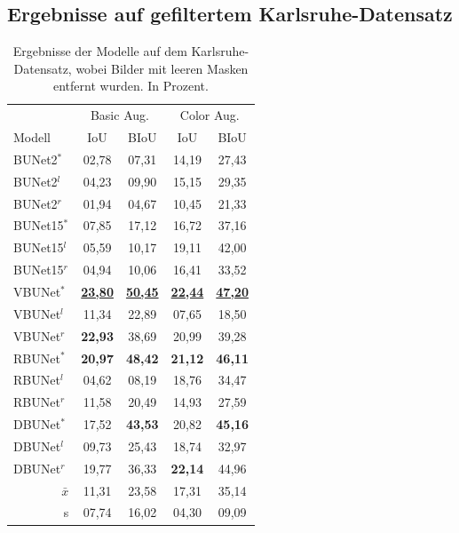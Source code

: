 \subsection{Ergebnisse auf gefiltertem Karlsruhe-Datensatz}

\begin{table}[ht]
	\centering
	\begin{tabular}{l|cc|cc}
		& \multicolumn{2}{c|}{Basic Aug.} & \multicolumn{2}{c}{Color Aug.} \\ 
		Modell & \ac{IoU} & \ac{BIoU}  & \ac{IoU} & \ac{BIoU}  \\
		\toprule
        BUNet2$^*$ & 02,78 & 07,31  &  14,19 & 27,43 \\
        BUNet2$^l$ & 04,23 & 09,90  &  15,15 & 29,35 \\
        BUNet2$^r$ & 01,94 & 04,67  &  10,45 & 21,33 \\
		\midrule

        BUNet15$^*$ & 07,85 & 17,12  &  16,72 & 37,16 \\
        BUNet15$^l$ & 05,59 & 10,17  &  19,11 & 42,00 \\
        BUNet15$^r$ & 04,94 & 10,06  &  16,41 & 33,52 \\
		\midrule

        VBUNet$^*$ & \underline{\textbf{23,80}} & \underline{\textbf{50,45}} &  \underline{\textbf{22,44}} & \underline{\textbf{47,20}} \\
        VBUNet$^l$ & 11,34 & 22,89 &  07,65 & 18,50 \\
        VBUNet$^r$ & \textbf{22,93} & 38,69 &  20,99 & 39,28 \\
		\midrule

        RBUNet$^*$ & \textbf{20,97} & \textbf{48,42} &  \textbf{21,12} & \textbf{46,11} \\
        RBUNet$^l$ & 04,62 & 08,19 &  18,76 & 34,47 \\
        RBUNet$^r$ & 11,58 & 20,49 &  14,93 & 27,59 \\
		\midrule

        DBUNet$^*$ & 17,52 & \textbf{43,53} &  20,82 & \textbf{45,16} \\
        DBUNet$^l$ & 09,73 & 25,43 &  18,74 & 32,97 \\
        DBUNet$^r$ & 19,77 & 36,33 &  \textbf{22,14} & 44,96 \\

		\bottomrule
		\multicolumn{1}{r|}{$\bar{x}$}  & 11,31 &	23,58 &	17,31 &	35,14 \\
		\midrule
		\multicolumn{1}{r|}{s} & 07,74	& 16,02	& 04,30 &	09,09 \\

        
	\end{tabular}
	\caption{Ergebnisse der Modelle auf dem Karlsruhe-Datensatz, wobei Bilder mit leeren Masken entfernt wurden. 
    In Prozent.}
	\label{tab:results-ka-small}
\end{table}

